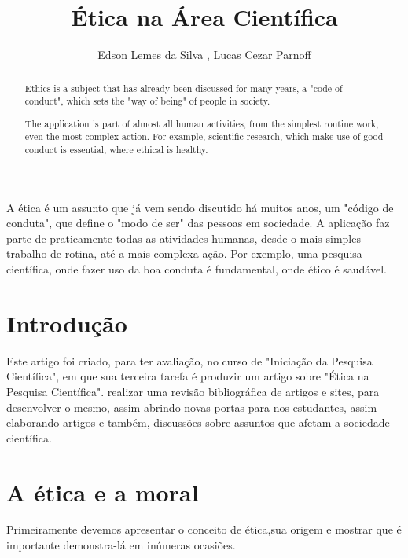 \documentclass[12pt]{article}
\title{Ética na Área Cientí­fica}
\author{Edson Lemes da Silva \inst{1}, Lucas Cezar Parnoff \inst{1}}
\begin{document}
 

\maketitle

\begin{abstract}
Ethics is a subject that has already been discussed for many years, a "code of conduct", which sets the "way of being" of people in society.

The application is part of almost all human activities, from the simplest routine work, even the most complex action. For example, scientific research, which make use of good conduct is essential, where ethical is healthy.
  
\end{abstract}
     
\begin{resumo}
   A ética é um assunto que já vem sendo discutido há muitos anos, um "código de conduta", que define o "modo de ser" das pessoas em sociedade. 
   A aplicação faz parte de praticamente todas as atividades humanas, desde o mais simples trabalho de rotina, até a mais complexa ação. Por exemplo, uma pesquisa científica, onde fazer uso da boa conduta é fundamental, onde ético é saudável.   
  
\end{resumo}


\section{Introdução}\label{sec:introducao}

Este artigo foi criado, para ter avaliação,
no curso de "Iniciação da Pesquisa Científica",
em que sua terceira tarefa é produzir um artigo
sobre "Ética na Pesquisa Científica". 
realizar uma 
revisão bibliográfica de artigos e sites, 
para desenvolver o mesmo, assim abrindo novas portas
para nos estudantes, assim elaborando artigos e
também, discussões sobre assuntos que afetam a 
sociedade científica.  

\section{A ética e a moral}\label{sec:conteudo}


Primeiramente devemos apresentar o conceito de ética,sua origem e mostrar que é importante demonstra-lá em inúmeras ocasiões.
\end{document}
